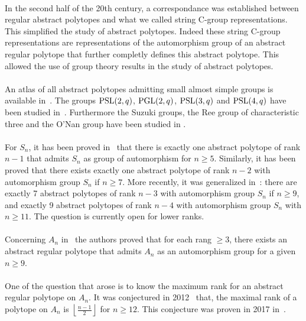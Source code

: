 \paragraph{}
In the second half of the 20th century, a correspondance was established between regular abstract polytopes and what we called string C-group representations. This simplified the study of abstract polytopes. Indeed these string C-group representations are representations of the automorphism group of an abstract regular polytope that further completly defines this abstract polytope. This allowed the use of group theory results in the study of abstract polytopes.

\paragraph{}
An atlas of all abstract polytopes admitting small almost simple groups is available in~\cite{atlasPolytopes}. The groups $\operatorname{PSL}(2,q)$, $\operatorname{PGL}(2,q)$, $\operatorname{PSL}(3,q)$ and $\operatorname{PSL}(4,q)$ have been studied in~\cite{psl2, psl3, psl4}. Furthermore the Suzuki groups, the Ree group of characteristic three and the O'Nan group have been studied in \cite{suzuki, ree, onan}.

\paragraph{}
For $S_n$, it has been proved in~\cite{highRankSym} that there is exactly one abstract polytope of rank $n-1$ that admits $S_n$ as group of automorphism for $n \ge 5$. Similarly, it has been proved that there exists exactly one abstract polytope of rank $n-2$ with automorphism group $S_n$ if $n \ge 7$. More recently, it was generalized in~\cite{leemansTransactions}: there are exactly 7 abstract polytopes of rank $n-3$ with automorphism group $S_n$ if $n \ge 9$, and exactly 9 abstract polytopes of rank $n-4$ with automorphism group $S_n$ with $n \ge 11$. The question is currently open for lower ranks.

\paragraph{}
Concerning $A_n$ in~\cite{highRankAlternating} the authors proved that for each rang $\ge 3$, there exists an abstract regular polytope that admits $A_n$ as an automorphism group for a given $n \ge 9$.

\paragraph{}
One of the question that arose is to know the maximum rank for an abstract regular polytope on $A_n$. It was conjectured in 2012~\cite{A12PolytopesRank} that, the maximal rank of a polytope on $A_n$ is $\left \lfloor \frac{n-1}{2} \right \rfloor$ for $n \ge 12$. This conjecture was proven in 2017 in~\cite{highestRankOfAn}.

